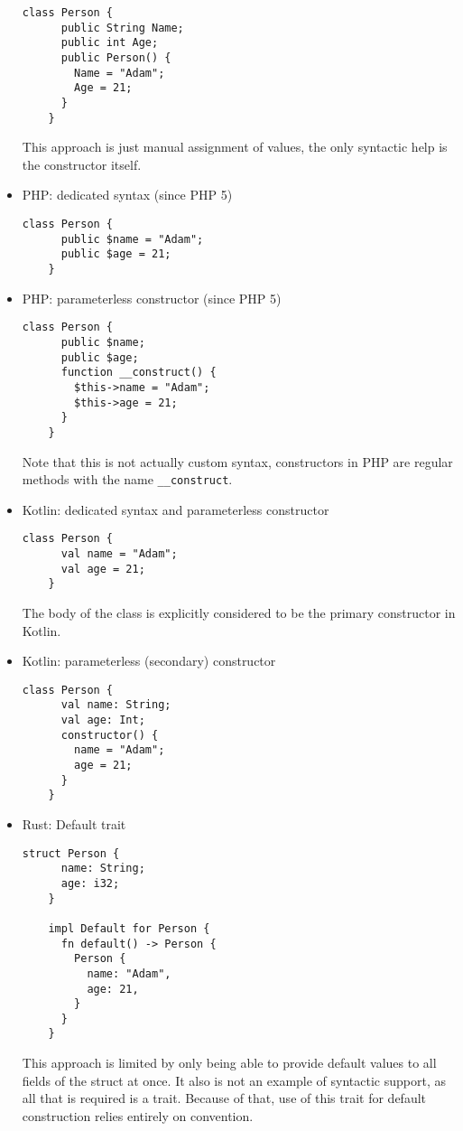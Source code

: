 \documentclass[en]{pracamgr}
\begin{document}
\begin{itemize}
\begin{lstlisting}[style=CSharp]
    class Person {
      public String Name;
      public int Age;
      public Person() {
        Name = "Adam";
        Age = 21;
      }
    }
  \end{lstlisting}
  This approach is just manual assignment of values, the only syntactic help is the constructor itself.
  \item PHP: dedicated syntax (since PHP 5)
  \begin{lstlisting}[style=PHP]
    class Person {
      public $name = "Adam";
      public $age = 21;
    }
  \end{lstlisting}
  \item  PHP: parameterless constructor (since PHP 5)
  \begin{lstlisting}[style=PHP]
    class Person {
      public $name;
      public $age;
      function __construct() {
        $this->name = "Adam";
        $this->age = 21;
      }
    }
  \end{lstlisting}
  Note that this is not actually custom syntax, constructors in PHP are regular methods
  with the name \texttt{\_\_construct}.
  \item Kotlin: dedicated syntax and parameterless constructor
  \begin{lstlisting}[style=Kotlin]
    class Person {
      val name = "Adam";
      val age = 21;
    }
  \end{lstlisting}
  The body of the class is explicitly considered to be the primary constructor in Kotlin.
  \item Kotlin: parameterless (secondary) constructor
  \begin{lstlisting}[style=Kotlin]
    class Person {
      val name: String;
      val age: Int;
      constructor() {
        name = "Adam";
        age = 21;
      }
    }
  \end{lstlisting}
  \item Rust: Default trait
  \begin{lstlisting}[style=Rust]
    struct Person {
      name: String;
      age: i32;
    }

    impl Default for Person {
      fn default() -> Person {
        Person {
          name: "Adam",
          age: 21,
        }
      }
    }
  \end{lstlisting}
  This approach is limited by only being able to provide default values to all fields 
  of the struct at once. It also is not an example of syntactic support, as all that is required is a trait.
  Because of that, use of this trait for default construction relies entirely on convention.
\end{itemize}
\end{document}
